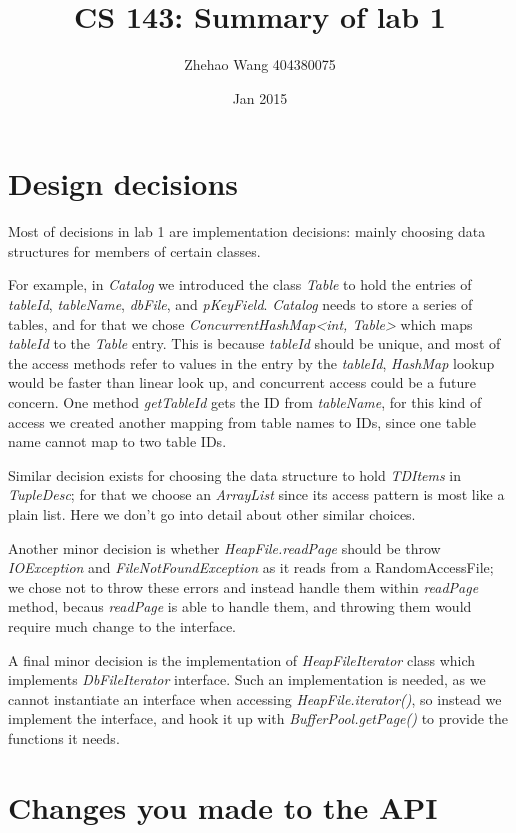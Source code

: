 \documentclass[11pt]{article}
\title{CS 143: Summary of lab 1}
\author{Zhehao Wang  404380075}
\date{Jan 2015}
\begin{document}
\maketitle

\section{Design decisions}

Most of decisions in lab 1 are implementation decisions: mainly choosing data structures for members of certain classes.

For example, in \textit{Catalog} we introduced the class \textit{Table} to hold the entries of \textit{tableId}, \textit{tableName}, \textit{dbFile}, and \textit{pKeyField}. \textit{Catalog} needs to store a series of tables, and for that we chose \textit{ConcurrentHashMap<int, Table>} which maps \textit{tableId} to the \textit{Table} entry. This is because \textit{tableId} should be unique, and most of the access methods refer to values in the entry by the \textit{tableId}, \textit{HashMap} lookup would be faster than linear look up, and concurrent access could be a future concern. One method \textit{getTableId} gets the ID from \textit{tableName}, for this kind of access we created another mapping from table names to IDs, since one table name cannot map to two table IDs.

Similar decision exists for choosing the data structure to hold \textit{TDItems} in \textit{TupleDesc}; for that we choose an \textit{ArrayList} since its access pattern is most like a plain list. Here we don't go into detail about other similar choices.

Another minor decision is whether \textit{HeapFile.readPage} should be throw \textit{IOException} and \textit{FileNotFoundException} as it reads from a RandomAccessFile; we chose not to throw these errors and instead handle them within \textit{readPage} method, becaus \textit{readPage} is able to handle them, and throwing them would require much change to the interface.

A final minor decision is the implementation of \textit{HeapFileIterator} class which implements \textit{DbFileIterator} interface. Such an implementation is needed, as we cannot instantiate an interface when accessing \textit{HeapFile.iterator()}, so instead we implement the interface, and hook it up with \textit{BufferPool.getPage()} to provide the functions it needs.

\section{Changes you made to the API}
\end{document}
